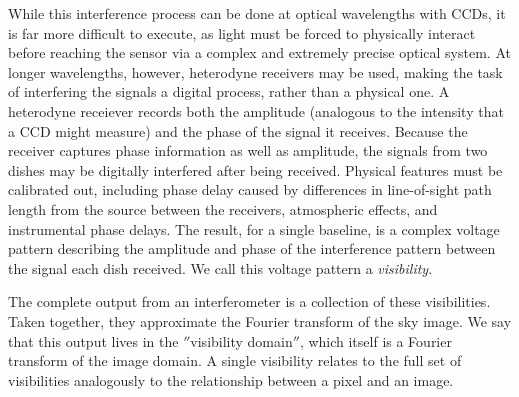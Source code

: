 


While this interference process can be done at optical wavelengths with CCDs, it is far more difficult to execute, as light must be forced to physically interact before reaching the sensor via a complex and extremely precise optical system. At longer wavelengths, however, heterodyne receivers may be used, making the task of interfering the signals a digital process, rather than a physical one. A heterodyne receiever records both the amplitude (analogous to the intensity that a CCD might measure) and the phase of the signal it receives. Because the receiver captures phase information as well as amplitude, the signals from two dishes may be digitally interfered after being received. Physical features must be calibrated out, including phase delay caused by differences in line-of-sight path length from the source between the receivers, atmospheric effects, and instrumental phase delays. The result, for a single baseline, is a complex voltage pattern describing the amplitude and phase of the interference pattern between the signal each dish received. We call this voltage pattern a \textit{visibility}.




The complete output from an interferometer is a collection of these visibilities. Taken together, they approximate the Fourier transform of the sky image. We say that this output lives in the $''$visibility domain$''$, which itself is a Fourier transform of the image domain. A single visibility relates to the full set of visibilities analogously to the relationship between a pixel and an image.


